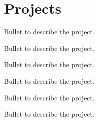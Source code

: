 \section{Projects}

\begin{resumeBullets}
    \item Bullet to describe the project.
    \item Bullet to describe the project.
    \item Bullet to describe the project.
\end{resumeBullets}

\begin{resumeBullets}
    \item Bullet to describe the project.
    \item Bullet to describe the project.
    \item Bullet to describe the project.
\end{resumeBullets}